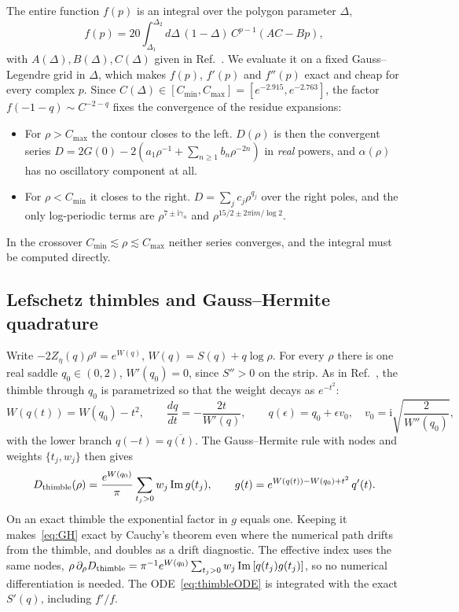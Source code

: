 \documentclass[floatfix,aps,pre,preprint,superscriptaddress,nofootinbib,amsmath,amssymb]{revtex4-2}
\def\I{\mathrm{i}}
\begin{document}
The entire function $f(p)$ is an integral over the polygon parameter $\Delta$,
\begin{equation}
    f(p)=20\int_{\Delta_1}^{\Delta_2}d\Delta\,(1-\Delta)\,C^{p-1}\left(AC-Bp\right),
    \label{eq:fp}
\end{equation}
with $A(\Delta),B(\Delta),C(\Delta)$ given in Ref.~\cite{migdal2024quantum}. We evaluate it on a fixed Gauss--Legendre grid in $\Delta$, which makes $f(p)$, $f'(p)$ and
$f''(p)$ exact and cheap for every complex $p$. Since $C(\Delta)\in[C_{\min},C_{\max}]=[e^{-2.915},e^{-2.763}]$, the factor
$f(-1-q)\sim C^{-2-q}$ fixes the convergence of the residue expansions:
\begin{itemize}
\item For $\rho>C_{\max}$ the contour closes to the left. $D(\rho)$ is then the convergent series
$D=2G(0)-2\left(a_1\rho^{-1}+\sum_{n\ge1}b_n\rho^{-2n}\right)$ in \emph{real} powers, and $\alpha(\rho)$ has no oscillatory component at all.
\item For $\rho<C_{\min}$ it closes to the right. $D=\sum_j c_j\rho^{q_j}$ over the right poles, and the only log-periodic terms
are $\rho^{7\pm\I\gamma_n}$ and $\rho^{15/2\pm2\pi\I m/\log2}$.
\end{itemize}
In the crossover $C_{\min}\lesssim\rho\lesssim C_{\max}$ neither series converges, and the integral must be computed directly.

\subsection{Lefschetz thimbles and Gauss--Hermite quadrature}

Write $-2Z_\eta(q)\rho^q=e^{W(q)}$, $W(q)=S(q)+q\log\rho$. For every $\rho$ there is one real saddle $q_0\in(0,2)$,
$W'(q_0)=0$, since $S''>0$ on the strip. As in Ref.~\cite{migdal2026Riemann}, the thimble through $q_0$ is parametrized so
that the weight decays as $e^{-t^2}$:
\begin{equation}
    W\left(q(t)\right)=W(q_0)-t^2,\qquad \frac{dq}{dt}=-\frac{2t}{W'(q)},\qquad
    q(\epsilon)=q_0+\epsilon v_0,\quad v_0=\I\sqrt{\frac{2}{W''(q_0)}},
    \label{eq:thimbleODE}
\end{equation}
with the lower branch $q(-t)=\overline{q(t)}$. The Gauss--Hermite rule with nodes and weights $\{t_j,w_j\}$ then gives
\begin{equation}
    D_{\rm thimble}(\rho)=\frac{e^{W(q_0)}}{\pi}\sum_{t_j>0}w_j\,\mathrm{Im}\,g(t_j),\qquad
    g(t)=e^{W(q(t))-W(q_0)+t^2}\,q'(t).
    \label{eq:GH}
\end{equation}
On an exact thimble the exponential factor in $g$ equals one. Keeping it makes~\eqref{eq:GH} exact by Cauchy's theorem even
where the numerical path drifts from the thimble, and doubles as a drift diagnostic. The effective index uses the same
nodes, $\rho\,\partial_\rho D_{\rm thimble}=\pi^{-1}e^{W(q_0)}\sum_{t_j>0}w_j\,\mathrm{Im}\left[q(t_j)g(t_j)\right]$, so no
numerical differentiation is needed. The ODE~\eqref{eq:thimbleODE} is integrated with the exact $S'(q)$, including $f'/f$.
\end{document}
